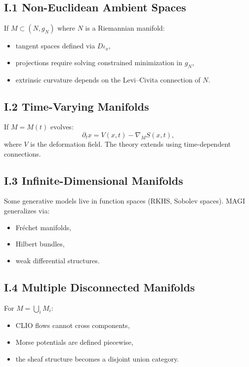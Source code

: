 \documentclass[11pt,a4paper,twocolumn]{article}
\begin{document}
\subsection*{I.1 Non-Euclidean Ambient Spaces}

If $M \subset (N,g_N)$ where $N$ is a Riemannian manifold:
\begin{itemize}
\item tangent spaces defined via $D\iota_x$,
\item projections require solving constrained minimization in $g_N$,
\item extrinsic curvature depends on the Levi--Civita connection of $N$.
\end{itemize}

\subsection*{I.2 Time-Varying Manifolds}

If $M = M(t)$ evolves:
\[
\partial_t x = V(x,t) - \nabla_M S(x,t),
\]
where $V$ is the deformation field.
The theory extends using time-dependent connections.

\subsection*{I.3 Infinite-Dimensional Manifolds}

Some generative models live in function spaces (RKHS, Sobolev spaces).
MAGI generalizes via:
\begin{itemize}
\item Fréchet manifolds,
\item Hilbert bundles,
\item weak differential structures.
\end{itemize}

\subsection*{I.4 Multiple Disconnected Manifolds}

For $M = \bigcup_i M_i$:
\begin{itemize}
\item CLIO flows cannot cross components,
\item Morse potentials are defined piecewise,
\item the sheaf structure becomes a disjoint union category.
\end{itemize}
\end{document}
